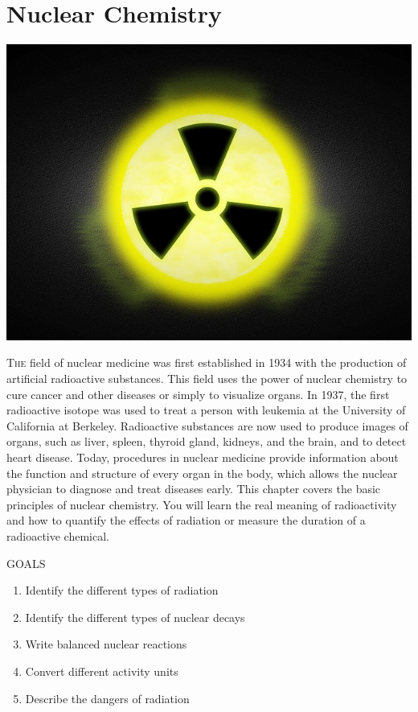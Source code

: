 \documentclass[main.tex]{subfiles}
\begin{document}
\chapter[Nuclear Chemistry]{Nuclear Chemistry}

\begin{marginfigure}
      \includegraphics{../Ch-nuclear/figure1}
   \end{marginfigure}
\lettrine[lines=4]{\color{black!45}T}{he} field of nuclear medicine was first established in 1934 with the production of artificial radioactive substances. This field uses the power of nuclear chemistry to cure cancer and other diseases or simply to visualize organs. In 1937, the first radioactive isotope was used to treat a person with leukemia at the University of California at Berkeley. Radioactive substances are now used to produce images of organs, such as liver, spleen, thyroid gland, kidneys, and the brain, and to detect heart disease. Today, procedures in nuclear medicine provide information about the function and structure of every organ in the body, which allows the nuclear physician to diagnose and treat diseases early. This chapter covers the basic principles of nuclear chemistry. You will learn the real meaning of radioactivity and how to quantify the effects of radiation or measure the duration of a radioactive chemical.
\begin{marginfigure}%
\begin{mytcbox}{GOALS}
\begin{enumerate}[label=\protect\circled{\color{white}\arabic*}]
\item Identify the different types of radiation
\item Identify the different types of nuclear decays
\item Write balanced nuclear reactions
\item Convert different activity units
\item Describe the dangers of radiation

\end{enumerate}
\end{mytcbox}
\end{marginfigure}%
\end{document}
